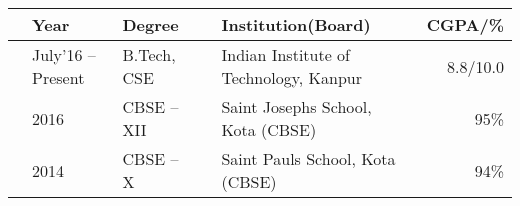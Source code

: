 
\newcommand{\education}[4]{
  & #1 & #2 & &#3 & #4
}


\begin{tabular}{ | L{0.05cm} l | L{3cm} | L{0.05cm} C{8cm} | r |}
  \hline
  \education{\textbf{Year}}{\textbf{Degree}}{\textbf{Institution(Board)}}{\textbf{CGPA/\%}}\\
  \hline
  \education{July'16 -- Present}{B.Tech, CSE}{Indian Institute of Technology, Kanpur}{8.8/10.0}\\
  \education{2016}{CBSE -- XII}{Saint Josephs School, Kota (CBSE)}{95\%}\\
  \education{2014}{CBSE -- X}{Saint Pauls School, Kota (CBSE)}{94\%}\\
  \hline
\end{tabular}

